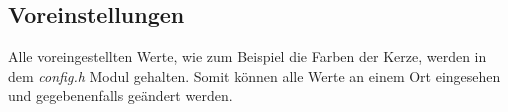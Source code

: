 \subsection{Voreinstellungen}\label{config}
    Alle voreingestellten Werte, wie zum Beispiel die Farben der Kerze,
    werden in dem \textit{config.h} Modul gehalten. Somit können alle Werte an
    einem Ort eingesehen und gegebenenfalls geändert werden.
    
